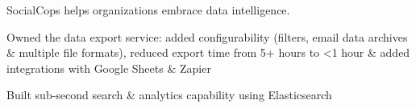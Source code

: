 \documentclass[]{AayushSarva}
\begin{document}
\begin{minipage}[t]{0.66\textwidth}
\begin{tightemize}
\end{tightemize}

\vspace{0.5em}


\hfill
{}

\vspace{0.3em}

SocialCops helps organizations embrace data intelligence.

\vspace{0.1em}


\begin{tightemize}

\item Owned the data export service: added configurability (filters, email data archives \& multiple file formats), reduced export time from 5+ hours to <1 hour \& added integrations with Google Sheets \& Zapier



\item Built sub-second search \& analytics capability using Elasticsearch


\end{tightemize}
\vspace{0.5em}


\end{minipage}
\end{document}
